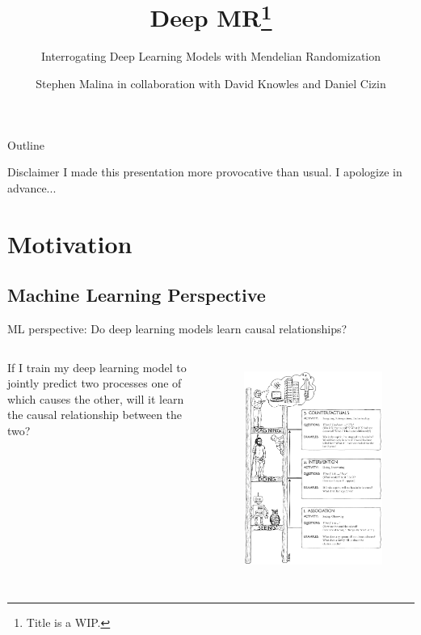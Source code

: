 \documentclass[pdf]{beamer} %
\title{Deep MR\footnote{Title is a WIP.}}
\subtitle{Interrogating Deep Learning Models with Mendelian Randomization}
\author{Stephen Malina in collaboration with David Knowles and Daniel Cizin}
\begin{document}
\begin{frame}
\titlepage
\end{frame}
\begin{frame}{Outline}
    \begin{block}{Disclaimer}
        I made this presentation more provocative than usual. I apologize in advance...
    \end{block}
    \tableofcontents
\end{frame}

\section{Motivation}
\subsection{Machine Learning Perspective}
 
\begin{frame}[t]{ML perspective: Do deep learning models learn causal relationships?}
    
    \begin{columns}
        If I train my deep learning model to jointly predict two processes one of which causes the other, will it learn the causal relationship between the two?
    \begin{figure}[htpb]
        \centering
        \includegraphics[width=0.7\linewidth]{figures/ladder_of_causation}
        \label{fig:ladder_of_causation}
    \end{figure}
    \end{columns}

\end{frame}
\end{document}
